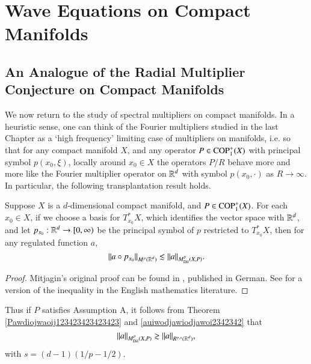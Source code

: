 \chapter{Wave Equations on Compact Manifolds} \label{chap:waveequation}

\section{An Analogue of the Radial Multiplier Conjecture on Compact Manifolds} \label{sec:AnAnalogueOf}

We now return to the study of spectral multipliers on compact manifolds. In a heuristic sense, one can think of the Fourier multipliers studied in the last Chapter as a `high frequency' limiting case of multipliers on manifolds, i.e. so that for any compact manifold $X$, and any operator $P \in {\text{COP}^{+}_{{1}}}(X)$ with principal symbol $p(x_0,\xi)$, locally around $x_0 \in X$ the operators $P/R$ behave more and more like the Fourier multiplier operator on $\operatorname{\mathbb{R}}^d$ with symbol $p(x_0,\cdot)$ as $R \to \infty$. In particular, the following transplantation result holds.

\begin{theorem} \label{Pawdiojwaoij123423423423423}
  Suppose $X$ is a $d$-dimensional compact manifold, and $P \in {\text{COP}^{+}_{{1}}}(X)$. For each $x_0 \in X$, if we choose a basis for $T_{x_0}^* X$, which identifies the vector space with $\operatorname{\mathbb{R}}^d$, and let $p_{x_0}: \operatorname{\mathbb{R}}^d \to [0,\infty)$ be the principal symbol of $p$ restricted to $T_{x_0}^* X$, then for any regulated function $a$,
  \[ \| a \circ p_{x_0} \|_{M^p(\operatorname{\mathbb{R}}^d)} \lesssim \| a \|_{M^p_{\text{Dil}}(X,P)}. \]
\end{theorem}
\begin{proof}
  Mitjagin's original proof can be found in \cite{Mitjagin}, published in German. See \cite{KenigStantonTomas} for a version of the inequality in the English mathematics literature.
\end{proof}

Thus if $P$ satisfies Assumption A, it follows from Theorem \ref{Pawdiojwaoij123423423423423} and \eqref{auiwodjawiodjawoi2342342} that
%
\begin{equation} \label{upperboundawdoiwjdoawi}
  \| a \|_{M^p_{\text{Dil}}(X,P)} \gtrsim \| a \|_{R^{p,s}(\operatorname{\mathbb{R}}^d)},
\end{equation}
%
with $s = (d-1)(1/p - 1/2)$.

